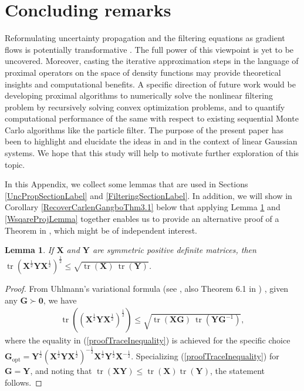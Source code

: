 \documentclass[letterpaper,10pt,twocolumn,conference]{ieeeconf}
\newtheorem{lemma}{Lemma}
\newcommand{\tr}{\operatorname{tr}}
\begin{document}
\section{Concluding remarks} 

Reformulating uncertainty propagation and the filtering equations as gradient flows \cite{AmbrosioBook2008} is 
potentially transformative \cite{JKO1998} \cite{LaugesenMehta2015}. The full power of this viewpoint is yet to be uncovered. Moreover, casting the iterative approximation steps in the language of proximal operators on the space of density functions may provide theoretical insights and computational benefits. A specific direction of future work would be developing proximal algorithms \cite{ParikhBoyd2013} to numerically solve the nonlinear filtering problem by recursively solving convex optimization problems, and to quantify computational performance of the same with respect to existing sequential Monte Carlo algorithms like the particle filter. The purpose of the present paper has been to highlight and elucidate the ideas in \cite{JKO1998} and \cite{LaugesenMehta2015} in the context of linear Gaussian systems. We hope that this study will help to motivate further exploration of this topic. 



\appendix
In this Appendix, we collect some lemmas that are used in Sections \ref{UncPropSectionLabel} and \ref{FilteringSectionLabel}. In addition, we will show in Corollary \ref{RecoverCarlenGangboThm3.1} below that applying Lemma \ref{TraceInequalityLemma} and \ref{WsqareProjLemma} together enables us to provide an alternative proof of a Theorem in \cite{CarlenGangbo2003}, which might be of independent interest.


\begin{lemma}\label{TraceInequalityLemma}
If $\bm{X}$ and $\bm{Y}$ are symmetric positive definite matrices, then $\tr\left(\bm{X}^{\frac{1}{2}}\bm{Y}\bm{X}^{\frac{1}{2}}\right)^{\frac{1}{2}} \leq \sqrt{\tr\left(\bm{X}\right)\:\tr\left(\bm{Y}\right)}$. 
\end{lemma}
\begin{proof}
From Uhlmann's variational formula (see \cite{Uhlmann1976}, also Theorem 6.1 in \cite{PetzBook2008})	, given any $\bm{G}\succ \bm{0}$, we have
\begin{eqnarray}
\tr\left(\left(\bm{X}^{\frac{1}{2}}\bm{Y}\bm{X}^{\frac{1}{2}}\right)^{\frac{1}{2}}\right) \leq \sqrt{\tr\left(\bm{XG}\right)\:\tr\left(\bm{YG}^{-1}\right)},
\label{proofTraceInequality}	
\end{eqnarray}
where the equality in (\ref{proofTraceInequality}) is achieved for the specific choice $\bm{G}_{\mathrm{opt}} = \bm{Y}^{\frac{1}{2}}\left(\bm{X}^{\frac{1}{2}}\bm{Y}\bm{X}^{\frac{1}{2}}\right)^{-\frac{1}{2}}\bm{X}^{\frac{1}{2}}\bm{Y}^{\frac{1}{2}}\bm{X}^{-\frac{1}{2}}$. Specializing (\ref{proofTraceInequality}) for $\bm{G} = \bm{Y}$, and noting that $\tr\left(\bm{X}\bm{Y}\right) \leq \tr\left(\bm{X}\right)\tr\left(\bm{Y}\right)$, the statement follows. 
\end{proof}
\end{document}
